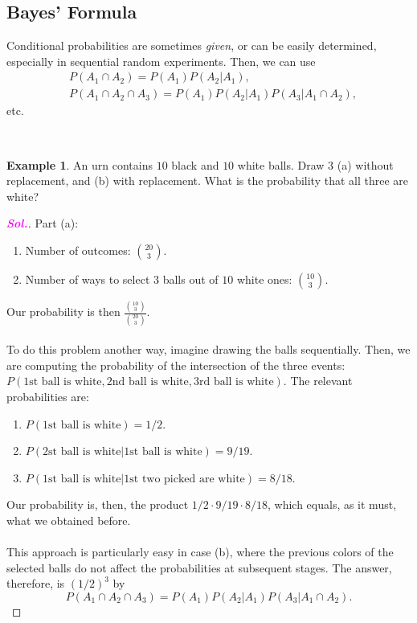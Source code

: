 \documentclass[12pt,a4paper]{article}
\theoremstyle{definition}
\newtheorem{example}{Example}[section]
\theoremstyle{definition}
\theoremstyle{definition}
\theoremstyle{definition}
\theoremstyle{remark}
\theoremstyle{definition}
\newcommand{\dispsty}{\displaystyle}
\newcommand{\sol}{\textcolor{magenta}{\bf \textit{Sol.}}\quad}
\begin{document}
\subsection{Bayes' Formula}
\begin{tcolorbox}[colback=white]
	Conditional probabilities are sometimes \textit{given}, or can be easily determined, especially in sequential random experiments. Then, we can use \begin{align*}
	&P(A_1\cap A_2)=P(A_1)P(A_2|A_1),\\
	&P(A_1\cap A_2\cap A_3)=P(A_1)P(A_2|A_1)P(A_3|A_1\cap A_2),
	\end{align*} etc.
\end{tcolorbox}
\
\begin{example}
	An urn contains $10$ black and $10$ white balls. Draw $3$ (a) without replacement, and (b) with replacement. What is the probability that all three are white?\begin{proof}[\sol]
		Part (a):\begin{enumerate}
			\item Number of outcomes: $\binom{20}{3}$.
			\item Number of ways to select $3$ balls out of $10$ white ones: $\binom{10}{3}$.
		\end{enumerate} Our probability is then $\dispsty\frac{\binom{10}{3}}{\binom{20}{3}}$.\\
	\\
	To do this problem another way, imagine drawing the balls sequentially. Then, we are computing the probability of the intersection of the three events: $P(1\text{st ball is white}, 2\text{nd ball is white}, 3\text{rd ball is white})$. The relevant probabilities are:\begin{enumerate}
		\item $P(1\text{st ball is white})=1/2$.
		\item $P(2\text{st ball is white}|1\text{st ball is white})=9/19$.
		\item $P(1\text{st ball is white}|1\text{st two picked are white})=8/18$.
	\end{enumerate} Our probability is, then, the product $1/2\cdot9/19\cdot8/18$, which equals, as it must, what we obtained before.\\
	\\
	This approach is particularly easy in case (b), where the previous colors of the selected balls do not affect the probabilities at subsequent stages. The answer, therefore, is $(1/2)^3$ by\[
	P(A_1\cap A_2\cap A_3)=P(A_1)P(A_2|A_1)P(A_3|A_1\cap A_2).
	\]
	\end{proof}
\end{example}
\end{document}
